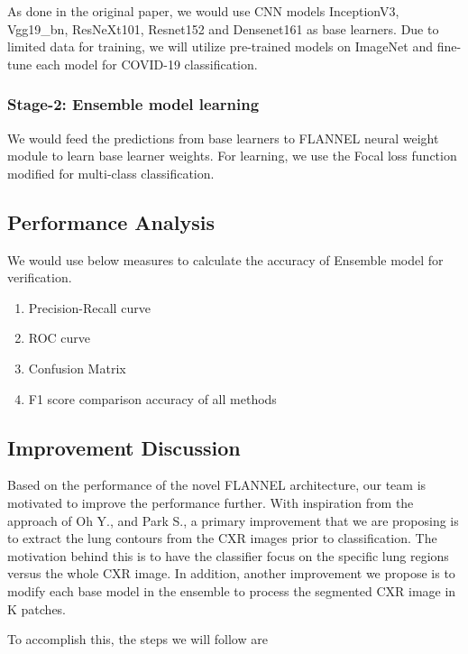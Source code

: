 \documentclass{sigkddExp}
\begin{document}
As done in the original paper, we would use CNN models InceptionV3, Vgg19\_bn,
ResNeXt101, Resnet152 and Densenet161 as base learners. Due to limited data for
training, we will utilize pre-trained models on ImageNet and fine-tune each
model for COVID-19 classification.

\subsubsection{Stage-2: Ensemble model learning}
We would feed the predictions from base learners to FLANNEL neural weight module
to learn base learner weights. For learning, we use the Focal loss function modified
for multi-class classification.

\subsection{Performance Analysis}
We would use below measures to calculate the accuracy of Ensemble model for verification.

\begin{enumerate}
    \item Precision-Recall curve
    \item ROC curve
    \item Confusion Matrix
    \item F1 score comparison accuracy of all methods 
\end{enumerate}



\subsection{Improvement Discussion}

Based on the performance of the novel FLANNEL architecture, our team is
motivated to improve the performance further. With inspiration from the approach
of Oh Y., and Park S., a primary improvement that we are proposing is to extract
the lung contours from the CXR images prior to classification. The motivation
behind this is to have the classifier focus on the specific lung regions versus
the whole CXR image. In addition, another improvement we propose is to modify
each base model in the ensemble to process the segmented CXR image in K patches.

To accomplish this, the steps we will follow are
\end{document}
